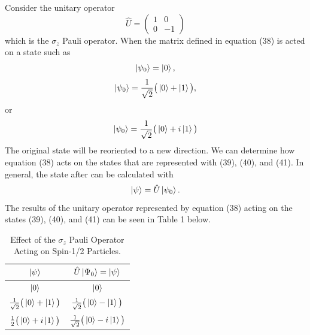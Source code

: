 \documentclass[twocolumn]{article}
\begin{document}
Consider the unitary operator
\begin{equation}
\hat{U}=
\begin{pmatrix}
1 & 0 \\
0 & -1
\end{pmatrix}
\end{equation}
which is the $\sigma_z$ Pauli operator. When the matrix defined in equation (38) is acted on a state such as
\begin{equation}
\ket{\psi_0}=\ket{0},
\end{equation}
\begin{equation}
\ket{\psi_0}=\frac{1}{\sqrt{2}}\big(\ket{0}+\ket{1}\big),
\end{equation}
or
\begin{equation}
\ket{\psi_0}=\frac{1}{\sqrt{2}}\big(\ket{0}+i\ket{1}\big)
\end{equation}
The original state will be reoriented to a new direction. We can determine how equation (38) acts on the states that are represented with (39), (40), and (41). In general, the state after can be calculated with
\begin{equation}
\ket{\psi}=\hat{U}\ket{\psi_0}.
\end{equation}
The results of the unitary operator represented by equation (38) acting on the states (39), (40), and (41) can be seen in Table 1 below. 
\begin{table}[h!]
\begin{center}
\begin{tabular}{ |c|c| }
\hline $\ket{\psi}$& $\hat{U}\ket{\Psi_0}=\ket{\psi}$ \\
\hline $\ket{0}$& $\ket{0}$\\
\hline $\frac{1}{\sqrt{2}}\big(\ket{0}+\ket{1}\big)$& $\frac{1}{\sqrt{2}}\big(\ket{0}-\ket{1}\big)$\\
\hline $\frac{1}{2}\big(\ket{0}+i\ket{1}\big)$& $\frac{1}{\sqrt{2}}\big(\ket{0}-i\ket{1}\big)$\\
\hline
\end{tabular}
\caption{Effect of the $\sigma_z$ Pauli Operator Acting on Spin-1/2 Particles.}
\end{center}
\end{table} \\
\end{document}
